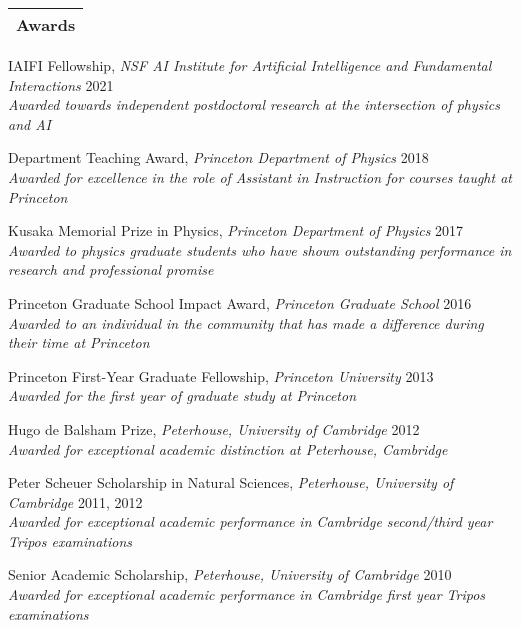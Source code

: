 \documentclass[11pt]{article}
\newenvironment{packed_itemize}{
\begin{itemize}[label=\raisebox{0.25ex}{\tiny$\bullet$}]
  \setlength{\itemsep}{3pt}
  \setlength{\parskip}{0pt}
  \setlength{\parsep}{0pt}}{\end{itemize}
}
\begin{document}

\noindent
\begin{tabular*}{\textwidth}{l@{\extracolsep{\fill}}}
\large {\sc \Large{Awards}}\\
\hline
\end{tabular*}\vspace{1.mm}

\begin{packed_itemize}
  \item IAIFI Fellowship, \emph{NSF AI Institute for Artificial Intelligence and Fundamental Interactions} \hfill 2021 \\ \emph{Awarded towards independent postdoctoral research at the intersection of physics and AI}
  \item Department Teaching Award, \emph{Princeton Department of Physics}  \hfill 2018 \\ \emph{Awarded for excellence in the role of Assistant in Instruction for courses taught at Princeton}
  \item Kusaka Memorial Prize in Physics, \emph{Princeton Department of Physics} \hfill 2017 \\ \emph{Awarded to physics graduate students who have shown outstanding performance in research and professional promise}
  \item Princeton Graduate School Impact Award, \emph{Princeton Graduate School} \hfill 2016 \\ \emph{Awarded to an individual in the community that has made a difference during their time at Princeton}
  \item Princeton First-Year Graduate Fellowship, \emph{Princeton University} \hfill 2013 \\ \emph{Awarded for the first year of graduate study at Princeton}
  \item Hugo de Balsham Prize, \emph{Peterhouse, University of Cambridge}  \hfill 2012 \\ \emph{Awarded for exceptional academic distinction at Peterhouse, Cambridge}
  \item Peter Scheuer Scholarship in Natural Sciences, \emph{Peterhouse, University of Cambridge} \hfill 2011, 2012 \\ \emph{Awarded for exceptional academic performance in Cambridge second/third year Tripos examinations}
  \item Senior Academic Scholarship, \emph{Peterhouse, University of Cambridge} \hfill 2010\\ \emph{Awarded for exceptional academic performance in Cambridge first year Tripos examinations}
\end{packed_itemize}
\vspace{2.0mm}
\end{document}
